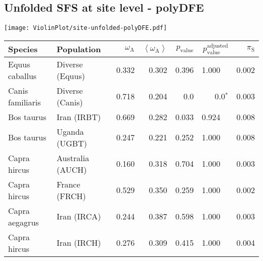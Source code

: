 \subsection{Unfolded SFS at site level - polyDFE} 
\begin{center}
\texttt{[image: ViolinPlot/site-unfolded-polyDFE.pdf]} 
\begin{adjustbox}{width = 1\textwidth}
\begin{tabular}{|l|l|r|r|r|r|r|}
\toprule
             Species &                      Population & $\omega_{\mathrm{A}}$ & $\left< \omega_{\mathrm{A}} \right>$ & $p_{\mathrm{value}}$ & $p_{\mathrm{value}}^{\mathrm{adjusted}}$ & $\pi_{\textrm{S}}$ \\
\midrule
      Equus caballus &                 Diverse (Equus) &                 0.332 &                                0.302 &                0.396 &                                  1.000~~ &              0.002 \\
    Canis familiaris &                 Diverse (Canis) &                 0.718 &                                0.204 &                  0.0 &                             0.0$\bm{^*}$ &              0.003 \\
          Bos taurus &                     Iran (IRBT) &                 0.669 &                                0.282 &                0.033 &                                  0.924~~ &              0.008 \\
          Bos taurus &                   Uganda (UGBT) &                 0.247 &                                0.221 &                0.252 &                                  1.000~~ &              0.008 \\
        Capra hircus &                Australia (AUCH) &                 0.160 &                                0.318 &                0.704 &                                  1.000~~ &              0.003 \\
        Capra hircus &                   France (FRCH) &                 0.529 &                                0.350 &                0.259 &                                  1.000~~ &              0.002 \\
      Capra aegagrus &                     Iran (IRCA) &                 0.244 &                                0.387 &                0.598 &                                  1.000~~ &              0.003 \\
        Capra hircus &                     Iran (IRCH) &                 0.276 &                                0.309 &                0.415 &                                  1.000~~ &              0.004 \\

\end{tabular}
\end{adjustbox}
\end{center}
